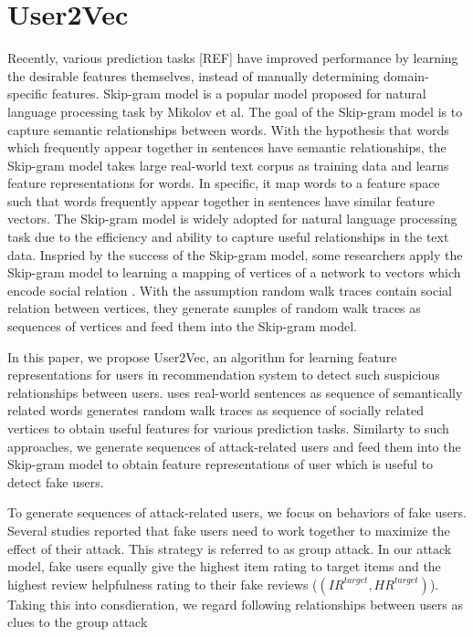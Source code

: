 \documentclass[master,english,final]{kaist-ucs}
\begin{document}
\section{User2Vec}
Recently, various prediction tasks [REF] have improved performance by learning the desirable features themselves, instead of manually determining domain-specific features.
Skip-gram model \cite{Word2Vec} is a popular model proposed for natural language processing task by Mikolov et al.
The goal of the Skip-gram model is to capture semantic relationships between words.
With the hypothesis that words which frequently appear together in sentences have semantic relationships, the Skip-gram model takes large real-world text corpus as training data and learns feature representations for words.
In specific, it map words to a feature space such that words frequently appear together in sentences have similar feature vectors.
The Skip-gram model is widely adopted for natural language processing task due to the efficiency and ability to capture useful relationships in the text data.
Inspried by the success of the Skip-gram model, some researchers apply the Skip-gram model to learning a mapping of vertices of a network to vectors which encode social relation \cite{DeepWalk,Node2Vec}.
With the assumption random walk traces contain social relation between vertices, they generate samples of random walk traces as sequences of vertices and feed them into the Skip-gram model.

In this paper, we propose User2Vec, an algorithm for learning feature representations for users in recommendation system to detect such suspicious relationships between users.
\cite{Word2Vec} uses real-world sentences as sequence of semantically related words \cite{DeepWalk,Node2Vec} generates random walk traces as sequence of socially related vertices to obtain useful features for various prediction tasks.
Similarty to such approaches, we generate sequences of attack-related users and feed them into the Skip-gram model to obtain feature representations of user which is useful to detect fake users.

To generate sequences of attack-related users, we focus on behaviors of fake users.
Several studies \cite{LiesAndPropaganda,UnsupervisedShilling} reported that fake users need to work together to maximize the effect of their attack.
This strategy is referred to as group attack.
In our attack model, fake users equally give the highest item rating to target items and the highest review helpfulness rating to their fake reviews ($(IR^{target},HR^{target})$).
Taking this into consdieration, we regard following relationships between users as clues to the group attack
\end{document}

